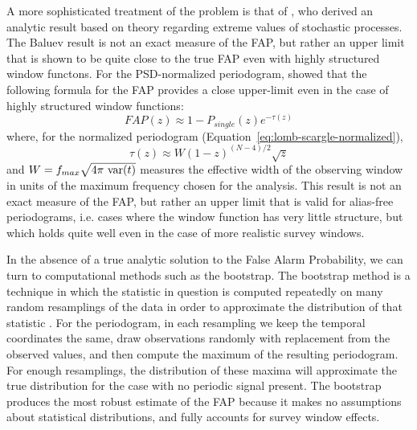 \documentclass[preprint]{aastex}
\newcommand{\Eq}[1]{Equation~\ref{eq:#1}}
\newcommand{\eq}[1]{\Eq{#1}}
\newcommand{\eqlabel}[1]{\label{eq:#1}}
\begin{document}
A more sophisticated treatment of the problem is that of \citet{Baluev2008},
who derived an analytic result based on theory regarding extreme values
of stochastic processes.
The Baluev result is not an exact measure of the FAP, but rather an upper
limit that is shown to be quite close to the true FAP even
with highly structured window functons.
For the PSD-normalized periodogram, \citet{Baluev2008} showed that the following
formula for the FAP provides a close upper-limit even in the case of
highly structured window functions:
\begin{equation}
  FAP(z) \approx 1 - P_{single}(z)e^{-\tau(z)}
  \eqlabel{FAP-baluev}
\end{equation}
where, for the normalized periodogram (\eq{lomb-scargle-normalized}),
\begin{equation}
  \tau(z) \approx W (1 - z)^{(N - 4)/2}\sqrt{z}
\end{equation}
and $W = f_{max} \sqrt{4\pi\ {\rm var}(t)}$ measures the effective width of the
observing window in units of the maximum frequency chosen for the analysis.
This result is not an exact measure of the FAP, but rather an
upper limit that is valid for alias-free periodograms, {i.e.} cases
where the window function has very little structure,
but which holds quite well even in the case of more realistic survey windows.

In the absence of a true analytic solution to the False Alarm Probability, we
can turn to computational methods such as the bootstrap.
The bootstrap method is a technique in which the statistic in question is
computed repeatedly on many random resamplings of the data in order to
approximate the distribution of that statistic
\citep[see][for a useful general discussion of this technique]{ICVG2014}.
For the periodogram, in each resampling we keep the temporal coordinates
the same, draw observations randomly with replacement from the observed
values, and then compute the maximum of the resulting periodogram.
For enough resamplings, the distribution of these maxima will approximate
the true distribution for the case with no periodic signal present.
The bootstrap produces the most robust estimate of the FAP because it makes
no assumptions about statistical distributions, and fully accounts for survey
window effects.
\end{document}
